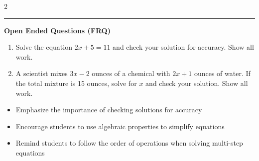 \documentclass[10pt]{article}
\begin{document}
\begin{multicols}{2}
\begin{enumerate}[label=\textbf{Q\arabic*.}, leftmargin=*, itemsep=6pt, parsep=0pt]
\end{enumerate}
\end{multicols}

\vspace{-0.2cm}
\hrule
\vspace{0.2cm}
\textbf{\small Open Ended Questions (FRQ)}
\begin{enumerate}[label=\textbf{Q\arabic*.}, start=9, itemsep=5pt, topsep=0pt]

  \item \small Solve the equation $2x + 5 = 11$ and check your solution for accuracy. Show all work. \vspace{2cm}

  \item \small A scientist mixes $3x - 2$ ounces of a chemical with $2x + 1$ ounces of water. If the total mixture is 15 ounces, solve for $x$ and check your solution. Show all work. \vspace{2cm}

\end{enumerate}

\vfill

\begin{tcolorbox}[colback=blue!5, colframe=mainblue!50, title=\small \textbf{Chef's Tips}, fonttitle=\bfseries, bottom=1mm]
\begin{itemize}[noitemsep, topsep=2pt, leftmargin=0.5cm]
  \item \scriptsize Emphasize the importance of checking solutions for accuracy\item \scriptsize Encourage students to use algebraic properties to simplify equations\item \scriptsize Remind students to follow the order of operations when solving multi-step equations
\end{itemize}
\end{tcolorbox}
\end{document}
